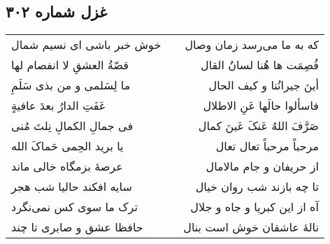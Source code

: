 \begin{center}
\section*{غزل شماره ۳۰۲}
\label{sec:sh302}
\begin{longtable}{l p{0.5cm} r}
خوش خبر باشی ای نسیم شمال
&&
که به ما می‌رسد زمان وصال
\\
قصّةُ العشقِ لا انفصام لها
&&
فُصِمَت ها هُنا لسانُ القال
\\
ما لِسَلمی و من بذی سَلَمِ
&&
أینَ جیرانُنا و کیف الحال
\\
عَفَتِ الدارُ بعدَ عافیةٍ
&&
فاسألوا حالَها عَنِ الاطلال
\\
فی جمالِ الکمالِ نِلتَ مُنی
&&
صَرَّفَ اللهُ عَنکَ عَینَ کمال
\\
یا برید الحِمی حَماکَ الله
&&
مرحباً مرحباً تعال تعال
\\
عرصهٔ بزمگاه خالی ماند
&&
از حریفان و جام مالامال
\\
سایه افکند حالیا شب هجر
&&
تا چه بازند شب روان خیال
\\
ترک ما سوی کس نمی‌نگرد
&&
آه از این کبریا و جاه و جلال
\\
حافظا عشق و صابری تا چند
&&
نالهٔ عاشقان خوش است بنال
\\
\end{longtable}
\end{center}
